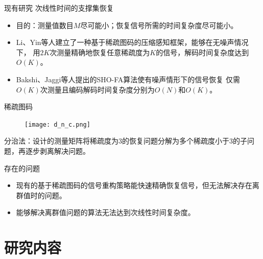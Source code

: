 \documentclass{ldr-simple-gray}
\begin{document}
\begin{frame}{现有研究}
    次线性时间的支撑集恢复
    \begin{itemize}
        \item 目的：测量值数目$M$尽可能小；恢复信号所需的时间复杂度尽可能小。
        \item Li、Yin等人建立了一种基于稀疏图码的压缩感知框架，能够在无噪声情况下，
        用$2K$次测量精确地恢复任意稀疏度为$K$的信号，解码时间复杂度达到$O(K)$。
        \item Bakshi、Jaggi等人提出的SHO-FA算法使有噪声情形下的信号恢复
        仅需$O(K)$次测量且编码解码时间复杂度分别为$O(N)$和$O(K)$。
    \end{itemize}
\end{frame}

\begin{frame}{稀疏图码}
    \begin{figure}
        \centering
        \texttt{[image: d\_n\_c.png]}
    \end{figure}
    分治法：设计的测量矩阵将稀疏度为3的恢复问题分解为多个稀疏度小于3的子问题，再逐步剥离解决问题。
\end{frame}


\begin{frame}{存在的问题}
    \begin{itemize}
        \item 现有的基于稀疏图码的信号重构策略能快速精确恢复信号，但无法解决存在离群值时的问题。
        \item 能够解决离群值问题的算法无法达到次线性时间复杂度。
    \end{itemize}
\end{frame}

\section{研究内容}
\end{document}
